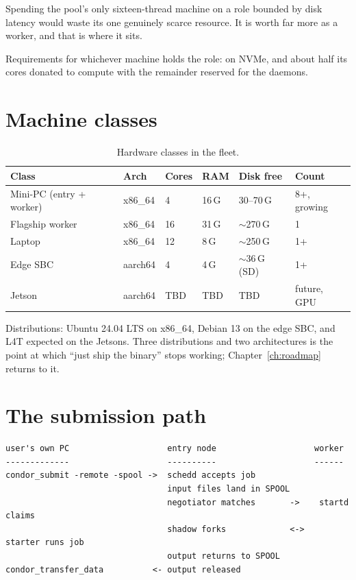 Spending the pool's only sixteen-thread machine on a role bounded by disk
latency would waste its one genuinely scarce resource. It is worth far more as a
worker, and that is where it sits.

Requirements for whichever machine holds the role:  on NVMe, and about
half its cores donated to compute with the remainder reserved for the daemons.

\section{Machine classes}

\begin{table}[H]
\centering
\begin{tabularx}{\textwidth}{L{0.27\textwidth} l l l l l}
\toprule
\textbf{Class} & \textbf{Arch} & \textbf{Cores} & \textbf{RAM} & \textbf{Disk free} & \textbf{Count} \\
\midrule
Mini-PC (entry + worker) & x86\_64  & 4   & 16\,G & 30--70\,G & 8+, growing \\
Flagship worker          & x86\_64  & 16  & 31\,G & $\sim$270\,G & 1 \\
Laptop                   & x86\_64  & 12  & 8\,G  & $\sim$250\,G & 1+ \\
Edge SBC                 & aarch64  & 4   & 4\,G  & $\sim$36\,G (SD) & 1+ \\
Jetson                   & aarch64  & TBD & TBD   & TBD & future, GPU \\
\bottomrule
\end{tabularx}
\caption{Hardware classes in the fleet.}
\end{table}

Distributions: Ubuntu 24.04 LTS on x86\_64, Debian 13 on the edge SBC, and L4T
expected on the Jetsons. Three distributions and two architectures is the point
at which ``just ship the binary'' stops working; Chapter~\ref{ch:roadmap}
returns to it.

\section{The submission path}

\begin{lstlisting}[style=term]
user's own PC                    entry node                    worker
-------------                    ----------                    ------
condor_submit -remote -spool ->  schedd accepts job
                                 input files land in SPOOL
                                 negotiator matches       ->    startd claims
                                 shadow forks             <->   starter runs job
                                 output returns to SPOOL
condor_transfer_data          <- output released
\end{lstlisting}

